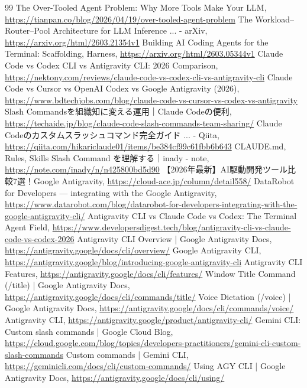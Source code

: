 \documentclass[a4paper,11pt]{ltjsarticle}
\begin{document}
\begin{thebibliography}{99}
 The Over-Tooled Agent Problem: Why More Tools Make Your LLM, \url{https://tianpan.co/blog/2026/04/19/over-tooled-agent-problem}
 The Workload--Router--Pool Architecture for LLM Inference ... - arXiv, \url{https://arxiv.org/html/2603.21354v1}
 Building AI Coding Agents for the Terminal: Scaffolding, Harness, \url{https://arxiv.org/html/2603.05344v1}
 Claude Code vs Codex CLI vs Antigravity CLI: 2026 Comparison, \url{https://nektony.com/reviews/claude-code-vs-codex-cli-vs-antigravity-cli}
 Claude Code vs Cursor vs OpenAI Codex vs Google Antigravity (2026), \url{https://www.bdtechjobs.com/blog/claude-code-vs-cursor-vs-codex-vs-antigravity}
 Slash Commandsを組織知に変える運用｜Claude Codeの便利, \url{https://techaide.jp/blog/claude-code-slash-commands-team-sharing/}
 Claude Codeのカスタムスラッシュコマンド完全ガイド ... - Qiita, \url{https://qiita.com/hikariclaude01/items/be384cf99c61fbb6b643}
 CLAUDE.md, Rules, Skills Slash Command を理解する｜inady - note, \url{https://note.com/inady/n/n425800bd5d90}
 【2026年最新】AI駆動開発ツール比較7選！Google Antigravity, \url{https://cloud-ace.jp/column/detail558/}
 DataRobot for Developers --- integrating with the Google Antigravity, \url{https://www.datarobot.com/blog/datarobot-for-developers-integrating-with-the-google-antigravity-cli/}
 Antigravity CLI vs Claude Code vs Codex: The Terminal Agent Field, \url{https://www.developersdigest.tech/blog/antigravity-cli-vs-claude-code-vs-codex-2026}
 Antigravity CLI Overview | Google Antigravity Docs, \url{https://antigravity.google/docs/cli/overview/}
 Google Antigravity CLI, \url{https://antigravity.google/blog/introducing-google-antigravity-cli}
 Antigravity CLI Features, \url{https://antigravity.google/docs/cli/features/}
 Window Title Command (/title) | Google Antigravity Docs, \url{https://antigravity.google/docs/cli/commands/title/}
 Voice Dictation (/voice) | Google Antigravity Docs, \url{https://antigravity.google/docs/cli/commands/voice/}
 Antigravity CLI, \url{https://antigravity.google/product/antigravity-cli/}
 Gemini CLI: Custom slash commands | Google Cloud Blog, \url{https://cloud.google.com/blog/topics/developers-practitioners/gemini-cli-custom-slash-commands}
 Custom commands | Gemini CLI, \url{https://geminicli.com/docs/cli/custom-commands/}
 Using AGY CLI | Google Antigravity Docs, \url{https://antigravity.google/docs/cli/using/}

\end{thebibliography}
\end{document}
